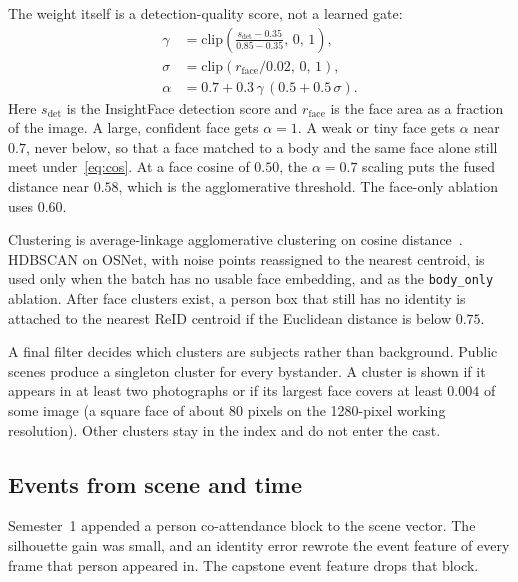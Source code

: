 \documentclass[conference]{IEEEtran}
\begin{document}
The weight itself is a detection-quality score, not a learned gate:
\begin{align}
\gamma &= \mathrm{clip}\!\left(\frac{s_{\det}-0.35}{0.85-0.35},\,0,\,1\right),\\
\sigma &= \mathrm{clip}(r_{\mathrm{face}}/0.02,\,0,\,1),\\
\alpha &= 0.7 + 0.3\,\gamma\,(0.5 + 0.5\,\sigma).
\label{eq:alpha}
\end{align}
Here $s_{\det}$ is the InsightFace detection score and $r_{\mathrm{face}}$ is
the face area as a fraction of the image. A large, confident face gets
$\alpha=1$. A weak or tiny face gets $\alpha$ near $0.7$, never below, so that
a face matched to a body and the same face alone still meet under~\eqref{eq:cos}.
At a face cosine of $0.50$, the $\alpha=0.7$ scaling puts the fused distance
near $0.58$, which is the agglomerative threshold. The face-only ablation uses
$0.60$.

Clustering is average-linkage agglomerative clustering on cosine
distance~\cite{pedregosa2011sklearn}. HDBSCAN on OSNet, with noise points
reassigned to the nearest centroid, is used only when the batch has no usable
face embedding, and as the \texttt{body\_only} ablation. After face clusters
exist, a person box that still has no identity is attached to the nearest ReID
centroid if the Euclidean distance is below $0.75$.

A final filter decides which clusters are subjects rather than background.
Public scenes produce a singleton cluster for every bystander. A cluster is
shown if it appears in at least two photographs or if its largest face covers
at least $0.004$ of some image (a square face of about 80 pixels on the
1280-pixel working resolution). Other clusters stay in the index and do not
enter the cast.

\subsection{Events from scene and time}
\label{sec:events}

Semester~1 appended a person co-attendance block to the scene vector. The
silhouette gain was small, and an identity error rewrote the event feature of
every frame that person appeared in. The capstone event feature drops that
block.
\end{document}
